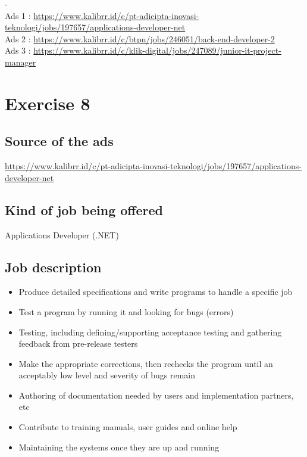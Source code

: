 \documentclass[12pt,titlepage]{article}
\begin{document}
- \\

Ads 1 : \url{https://www.kalibrr.id/c/pt-adicipta-inovasi-teknologi/jobs/197657/applications-developer-net} \\
Ads 2 : \url{https://www.kalibrr.id/c/btpn/jobs/246051/back-end-developer-2} \\
Ads 3 : \url{https://www.kalibrr.id/c/klik-digital/jobs/247089/junior-it-project-manager} \\

\section*{Exercise 8}
\subsection*{Source of the ads}
\url{https://www.kalibrr.id/c/pt-adicipta-inovasi-teknologi/jobs/197657/applications-developer-net}
\subsection*{Kind of job being offered}
Applications Developer (.NET) 
\subsection*{Job description}
\begin{itemize}
    \item Produce detailed specifications and write programs to handle a specific job
    \item Test a program by running it and looking for bugs (errors)
    \item Testing, including defining/supporting acceptance testing and gathering feedback from pre-release testers
    \item Make the appropriate corrections, then rechecks the program until an acceptably low level and severity of bugs remain
    \item Authoring of documentation needed by users and implementation partners, etc
    \item Contribute to training manuals, user guides and online help
    \item Maintaining the systems once they are up and running
\end{itemize}
\end{document}
